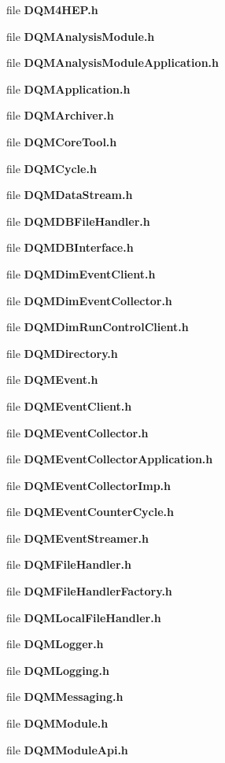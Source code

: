 \begin{DoxyCompactItemize}
\item 
file {\bf D\+Q\+M4\+H\+E\+P.\+h}
\item 
file {\bf D\+Q\+M\+Analysis\+Module.\+h}
\item 
file {\bf D\+Q\+M\+Analysis\+Module\+Application.\+h}
\item 
file {\bf D\+Q\+M\+Application.\+h}
\item 
file {\bf D\+Q\+M\+Archiver.\+h}
\item 
file {\bf D\+Q\+M\+Core\+Tool.\+h}
\item 
file {\bf D\+Q\+M\+Cycle.\+h}
\item 
file {\bf D\+Q\+M\+Data\+Stream.\+h}
\item 
file {\bf D\+Q\+M\+D\+B\+File\+Handler.\+h}
\item 
file {\bf D\+Q\+M\+D\+B\+Interface.\+h}
\item 
file {\bf D\+Q\+M\+Dim\+Event\+Client.\+h}
\item 
file {\bf D\+Q\+M\+Dim\+Event\+Collector.\+h}
\item 
file {\bf D\+Q\+M\+Dim\+Run\+Control\+Client.\+h}
\item 
file {\bf D\+Q\+M\+Directory.\+h}
\item 
file {\bf D\+Q\+M\+Event.\+h}
\item 
file {\bf D\+Q\+M\+Event\+Client.\+h}
\item 
file {\bf D\+Q\+M\+Event\+Collector.\+h}
\item 
file {\bf D\+Q\+M\+Event\+Collector\+Application.\+h}
\item 
file {\bf D\+Q\+M\+Event\+Collector\+Imp.\+h}
\item 
file {\bf D\+Q\+M\+Event\+Counter\+Cycle.\+h}
\item 
file {\bf D\+Q\+M\+Event\+Streamer.\+h}
\item 
file {\bf D\+Q\+M\+File\+Handler.\+h}
\item 
file {\bf D\+Q\+M\+File\+Handler\+Factory.\+h}
\item 
file {\bf D\+Q\+M\+Local\+File\+Handler.\+h}
\item 
file {\bf D\+Q\+M\+Logger.\+h}
\item 
file {\bf D\+Q\+M\+Logging.\+h}
\item 
file {\bf D\+Q\+M\+Messaging.\+h}
\item 
file {\bf D\+Q\+M\+Module.\+h}
\item 
file {\bf D\+Q\+M\+Module\+Api.\+h}
\item 

\end{DoxyCompactItemize}
